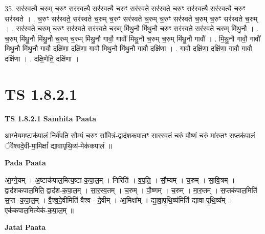 \documentclass[17pt]{extarticle}
\begin{document}
35. सर॑स्वत्यै च॒रुम् च॒रुꣳ सर॑स्वत्यै॒ सर॑स्वत्यै च॒रुꣳ सर॑स्वते॒ सर॑स्वते च॒रुꣳ सर॑स्वत्यै॒ सर॑स्वत्यै च॒रुꣳ सर॑स्वते । . च॒रुꣳ सर॑स्वते॒ सर॑स्वते च॒रुम् च॒रुꣳ सर॑स्वते च॒रुम् च॒रुꣳ सर॑स्वते च॒रुम् च॒रुꣳ सर॑स्वते च॒रुम् । . सर॑स्वते च॒रुम् च॒रुꣳ सर॑स्वते॒ सर॑स्वते च॒रुम् मि॑थु॒नौ मि॑थु॒नौ च॒रुꣳ सर॑स्वते॒ सर॑स्वते च॒रुम् मि॑थु॒नौ । . च॒रुम् मि॑थु॒नौ मि॑थु॒नौ च॒रुम् च॒रुम् मि॑थु॒नौ गावौ॒ गावौ॑ मिथु॒नौ च॒रुम् च॒रुम् मि॑थु॒नौ गावौ᳚ । . मि॒थु॒नौ गावौ॒ गावौ॑ मिथु॒नौ मि॑थु॒नौ गावौ॒ दक्षि॑णा॒ दक्षि॑णा॒ गावौ॑ मिथु॒नौ मि॑थु॒नौ गावौ॒ दक्षि॑णा । . गावौ॒ दक्षि॑णा॒ दक्षि॑णा॒ गावौ॒ गावौ॒ दक्षि॑णा । . दक्षि॒णेति॒ दक्षि॑णा । \newline
\pagebreak
{}
\section*{ TS 1.8.2.1 }

\textbf{TS 1.8.2.1 } \newline
\textbf{Samhita Paata} \newline

आ॒ग्ने॒यम॒ष्टाक॑पालं॒ निर्व॑पति सौ॒म्यं च॒रुꣳ सा॑वि॒त्रं-द्वाद॑शकपालꣳ सारस्व॒तं च॒रुं पौ॒ष्णं च॒रुं मा॑रु॒तꣳ स॒प्तक॑पालं ॅवैश्वदे॒वी-मा॒मिक्षां᳚ द्यावापृथि॒व्य॑-मेक॑कपालं ॥ \newline

\textbf{Pada Paata} \newline

आ॒ग्ने॒यम् । अ॒ष्टाक॑पाल॒मित्य॒ष्टा-क॒पा॒ल॒म् । निरिति॑ । व॒प॒ति॒ । सौ॒म्यम् । च॒रुम् । सा॒वि॒त्रम् । द्वाद॑शकपाल॒मिति॒ द्वाद॑श-क॒पा॒ल॒म् । सा॒र॒स्व॒तम् । च॒रुम् । पौ॒ष्णम् । च॒रुम् । मा॒रु॒तम् । स॒प्तक॑पाल॒मिति॑ स॒प्त -क॒पा॒ल॒म् । वै॒श्व॒दे॒वीमिति॑ वैश्व - दे॒वीम् । आ॒मिक्षा᳚म् । द्या॒वा॒पृ॒थि॒व्य॑मिति॑ द्यावा-पृ॒थि॒व्य᳚म् । एक॑कपाल॒मित्येक॑-क॒पा॒ल॒म् ॥  \newline



\textbf{Jatai Paata} \newline
\end{document}
